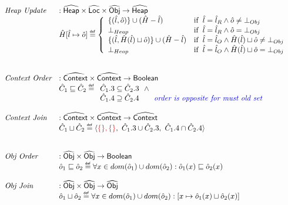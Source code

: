 \[\begin{array}{ll}
\textit{Heap Update} & : \aHeap \times \aLoc \times \aObj \rightarrow \aHeap \\
& \hat{H}[\hat{l} \mapsto \hat{o}] \defi
 \left\{
   \begin{array}{ll}
      \{( \hat{l}, \hat{o})\} \cup (\hat{H}-\hat{l})
      & \ifc{\hat{l} = \hat{l}_R \land \hat{o} \neq \bot_{Obj}} \\
      \bot_{Heap} 
      & \ifc{\hat{l} = \hat{l}_R \land \hat{o} = \bot_{Obj}} \\
      \{( \hat{l}, \hat{H}(\hat{l}) \sqcup \hat{o})\} \cup (\hat{H}-\hat{l})
      & \ifc{\hat{l} = \hat{l}_O \land \hat{H}(\hat{l}) \sqcup \hat{o} \neq \bot_{Obj}} \\
      \bot_{Heap} 
      & \ifc{\hat{l} = \hat{l}_O \land \hat{H}(\hat{l}) \sqcup \hat{o} = \bot_{Obj}} \\
   \end{array}
 \right.\\
\\\\


\textit{Context Order} & : \abs{Context} \times \abs{Context} \rightarrow \SF{Boolean} \\
& \hat{C}_1 \sqsubseteq \hat{C}_2 \defi 
  \begin{array}[t]{l}
    \hat{C}_1.3 \subseteq \hat{C}_2.3 ~~ \land \\
    \hat{C}_1.4 \supseteq \hat{C}_2.4 \quad\quad\comment{{\inblue order is opposite for must old set}}
  \end{array} \\
\\

\textit{Context Join} & : \abs{Context} \times \abs{Context} \rightarrow \abs{Context} \\
& \hat{C}_1 \sqcup \hat{C}_2 \defi 
  \langle
    {\inred \{ \}, \{ \}},\ 
    \hat{C}_1.3 \cup \hat{C}_2.3,\ 
    \hat{C}_1.4 \cap \hat{C}_2.4
  \rangle \\
\\\\


\textit{Obj Order} & : \aObj \times \aObj \rightarrow \SF{Boolean} \\
& \hat{o}_1 \sqsubseteq \hat{o}_2 \defi \forall x \in dom(\hat{o}_1) \cup dom(\hat{o}_2): \hat{o}_1(x) \sqsubseteq \hat{o}_2(x)\\
\\
\textit{Obj Join} & : \aObj \times \aObj \rightarrow \aObj \\
& \hat{o}_1 \sqcup \hat{o}_2  \defi \forall x \in dom(\hat{o}_1) \cup dom(\hat{o}_2): \left[x \mapsto \hat{o}_1(x) \sqcup \hat{o}_2(x)\right]\\
\\


\end{array}\]
